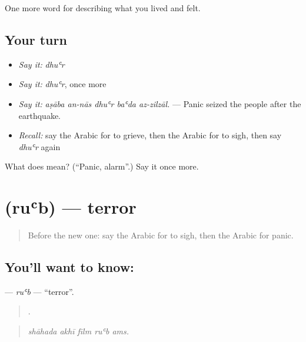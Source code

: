 \begin{grammarlens}[title={What you've built}]
One more word for describing what you lived and felt.
\end{grammarlens}

\subsection*{Your turn}
\begin{itemize}
\raggedright
  \item \emph{Say it:} \emph{dhuʿr}
  \item \emph{Say it:} \emph{dhuʿr}, once more
  \item \emph{Say it:} \emph{aṣāba an-nās dhuʿr baʿda az-zilzāl.} — Panic seized the people after the earthquake.
  \item \emph{Recall:} say the Arabic for to grieve, then the Arabic for to sigh, then say \emph{dhuʿr} again
\end{itemize}

\begin{tcolorbox}[breakable,colback=teal!4,colframe=teal!35!black,title={Before you move on}]
What does  mean? (\textquotedblleft{}Panic, alarm\textquotedblright{}.) Say it once more.
\end{tcolorbox}
\section[\texorpdfstring{\ar{رعب} (ruʿb)}{رعب (ruʿb)}]{ (ruʿb) — terror}

\label{lesson:AR-C489-rub}



\begin{quote}
Before the new one: say the Arabic for to sigh, then the Arabic for panic.
\end{quote}

\subsection*{You'll want to know: }
\textbf{} — \emph{ruʿb} — \textquotedblleft{}terror\textquotedblright{}.

\begin{quote}
    .
\end{quote}

\begin{quote}
\emph{shāhada akhī fīlm ruʿb ams.}
\end{quote}

